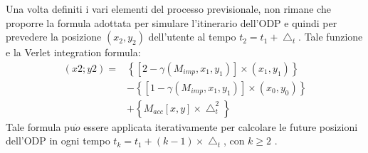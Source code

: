 Una volta definiti i vari elementi del processo previsionale, non rimane che
proporre la formula adottata per simulare l'itinerario dell'ODP e quindi per
prevedere la posizione $(x_{2},y_{2})$ dell'utente al tempo $t_{2} = t_{1} +\bigtriangleup_{t}$. Tale funzione
e la Verlet integration formula:
\begin{equation}
\begin{matrix}
(x2; y2) = & \left \{ [2 - \gamma(M_{imp},x_{1},y_{1})] \times (x_{1},y_{1}) \right \}\\
 & - \left \{ [1 - \gamma(M_{imp},x_{1},y_{1})] \times (x_{0},y_{0}) \right \} \\
 & + \left \{ M_{acc}[x,y] \times \bigtriangleup_{t}^{2} \right \}
\end{matrix}
\end{equation}
Tale formula pu$\grave{o}$ essere applicata iterativamente per calcolare le future
posizioni dell'ODP in ogni tempo $t_{k} = t_{1} + (k - 1) \times \bigtriangleup_{t}$, con $k \geq 2$ .

